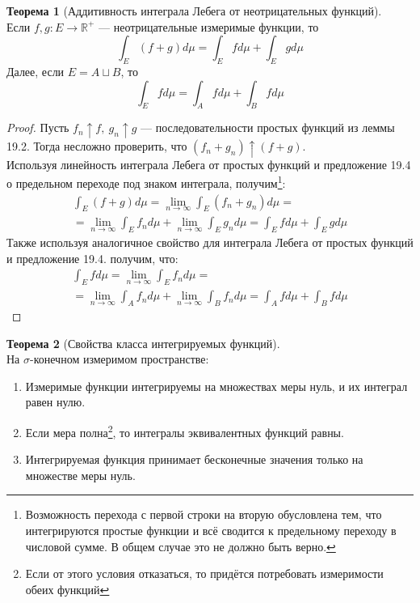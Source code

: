 \documentclass[11pt,a4paper]{report}
\def\Real{\mathbb{R}}
\theoremstyle{definition}
\theoremstyle{definition}
\newtheorem{theorem}{Теорема}[section]
\theoremstyle{definition}
\begin{document}
		\begin{theorem}[Аддитивность интеграла Лебега от неотрицательных функций]$  $\\
			Если $ f, g: E \to \Real^{+} $ — неотрицательные измеримые функции, то
			\[ \int_{E}(f + g) d\mu = \int_{E} f d\mu + \int_{E} g d\mu \]
			Далее, если $ E = A \sqcup B $, то \[ \int_{E} f d\mu = \int_{A} f d\mu + \int_{B} f d\mu \]
		\end{theorem}
		\begin{proof}
			Пусть $ f_{n} \uparrow f,\ g_{n} \uparrow g $ — последовательности простых функций из леммы 19.2. Тогда несложно проверить, что $ (f_{n} + g_{n}) \uparrow (f + g) $.\\
			Используя линейность интеграла Лебега от простых функций и предложение 19.4 о предельном переходе под знаком интеграла, получим\footnote{Возможность перехода с первой строки на вторую обусловлена тем, что интегрируются простые функции и всё сводится к предельному переходу в числовой сумме. В общем случае это не должно быть верно.}: 
			\begin{gather*}
				\int_{E} (f + g) d\mu = \lim_{n\to\infty} \int_{E} (f_{n} + g_{n}) d\mu =\\=
				\lim\limits_{n\to\infty} \int_{E} f_{n} d\mu + \lim\limits_{n\to\infty} \int_{E} g_{n} d\mu = \int_{E} f d\mu + \int_{E} g d\mu
			\end{gather*}
			Также используя аналогичное свойство для интеграла Лебега от простых функций и предложение 19.4. получим, что:
			\begin{gather*}
				\int_{E} f d\mu =    \lim_{n\to\infty} \int_{E} f_{n} d\mu =\\=
				\lim\limits_{n\to\infty} \int_{A} f_{n} d\mu + \lim\limits_{n\to\infty} \int_{B} f_{n} d\mu = \int_{A} f d\mu + \int_{B} f d\mu
			\end{gather*}
		\end{proof}
		\begin{theorem}[Свойства класса интегрируемых функций]$  $\\
			На $ \sigma $-конечном измеримом пространстве:
			\begin{enumerate}
				\item Измеримые функции интегрируемы на множествах меры нуль, и их интеграл равен нулю.
				\item Если мера полна\footnote{Если от этого условия отказаться, то придётся потребовать измеримости обеих функций}, то интегралы эквивалентных функций равны.
				\item Интегрируемая функция принимает бесконечные значения только на множестве меры нуль. 
			\end{enumerate} 
		\end{theorem}
\end{document}
